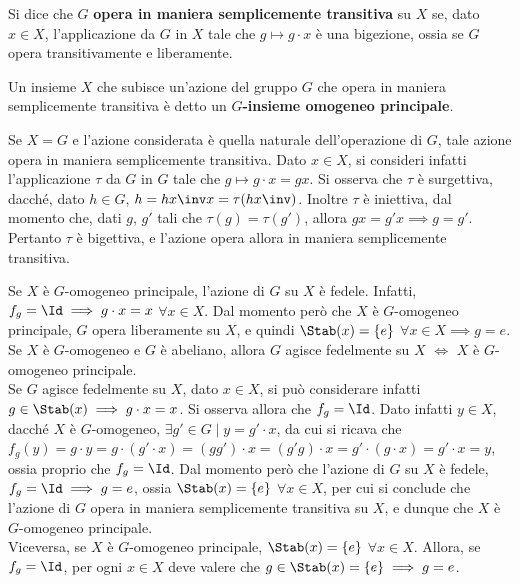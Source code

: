 \documentclass[11pt]{article}
\begin{document}
	\begin{definition}
		Si dice che $G$ \textbf{opera in maniera semplicemente transitiva} su $X$
		se, dato $x \in X$, l'applicazione da $G$ in $X$ tale che $g \mapsto g \cdot x$ è una bigezione,
		ossia se $G$ opera transitivamente e liberamente.
	\end{definition}

	\begin{definition}
		Un insieme $X$ che subisce un'azione del gruppo $G$ che opera in maniera
		semplicemente transitiva è
		detto un \textbf{$G$-insieme omogeneo principale}.
	\end{definition}
	
	\begin{example}
		Se $X = G$ e l'azione considerata è quella naturale dell'operazione di $G$,
		tale azione opera in maniera semplicemente transitiva. Dato $x \in X$, si consideri infatti l'applicazione $\tau$
		da $G$ in $G$ tale che
		$g \mapsto g \cdot x = gx$. Si osserva che $\tau$ è surgettiva, dacché, dato $h \in G$,
		$h = h x\inv x = \tau(h x\inv)$. Inoltre $\tau$ è iniettiva, dal momento che, dati $g$, $g'$
		tali che $\tau(g) = \tau(g')$, allora $gx = g' x \implies g = g'$. Pertanto $\tau$ è bigettiva, e
		l'azione opera allora in maniera semplicemente transitiva.
	\end{example}
	
	\begin{remark}\nl
		\li Se $X$ è $G$-omogeneo principale, l'azione di $G$ su $X$ è fedele. Infatti, $f_g = \Id \implies g \cdot x = x$ $\forall x \in X$. Dal momento però che $X$ è $G$-omogeneo principale, $G$ opera liberamente su $X$,
		e quindi $\Stab(x) = \{e\}$ $\forall x \in X \implies g = e$. \\

		\li Se $X$ è $G$-omogeneo e $G$ è abeliano, allora $G$ agisce fedelmente su $X$ $\iff$ $X$ è $G$-omogeneo principale. \\
		
		Se $G$ agisce fedelmente su $X$, dato $x \in X$, si può considerare infatti $g \in \Stab(x) \implies g \cdot x = x$. Si osserva allora
		che $f_g = \Id$. Dato infatti $y \in X$, dacché $X$ è $G$-omogeneo, $\exists g' \in G \mid y = g' \cdot x$,
		da cui si ricava che $f_g(y) = g \cdot y = g \cdot (g' \cdot x) = (gg') \cdot x = (g'g) \cdot x = g' \cdot (g \cdot x) = g' \cdot x = y$, ossia proprio che $f_g = \Id$. Dal momento però che l'azione di $G$ su $X$ è fedele,
		$f_g = \Id \implies g = e$, ossia $\Stab(x) = \{e\}$ $\forall x \in X$, per cui si conclude che l'azione
		di $G$ opera in maniera semplicemente transitiva su $X$, e dunque che $X$ è $G$-omogeneo principale. \\
		
		Viceversa, se $X$ è $G$-omogeneo principale, $\Stab(x) = \{ e \}$ $\forall x \in X$. Allora, se $f_g = \Id$,
		per ogni $x \in X$ deve valere che $g \in \Stab(x) = \{ e \} \implies g = e$.
	\end{remark}
	
\end{document}
